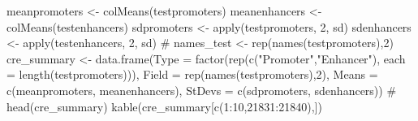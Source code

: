 \documentclass[
  letterpaper,
  DIV=11,
  numbers=noendperiod]{scrartcl}
\newenvironment{Shaded}{\begin{snugshade}}{\end{snugshade}}
\newcommand{\AttributeTok}[1]{\textcolor[rgb]{0.40,0.45,0.13}{#1}}
\newcommand{\CommentTok}[1]{\textcolor[rgb]{0.37,0.37,0.37}{#1}}
\newcommand{\DecValTok}[1]{\textcolor[rgb]{0.68,0.00,0.00}{#1}}
\newcommand{\FunctionTok}[1]{\textcolor[rgb]{0.28,0.35,0.67}{#1}}
\newcommand{\NormalTok}[1]{\textcolor[rgb]{0.00,0.23,0.31}{#1}}
\newcommand{\OtherTok}[1]{\textcolor[rgb]{0.00,0.23,0.31}{#1}}
\newcommand{\SpecialCharTok}[1]{\textcolor[rgb]{0.37,0.37,0.37}{#1}}
\newcommand{\StringTok}[1]{\textcolor[rgb]{0.13,0.47,0.30}{#1}}
\begin{document}
\begin{Shaded}
\begin{Highlighting}[]
\NormalTok{meanpromoters }\OtherTok{\textless{}{-}} \FunctionTok{colMeans}\NormalTok{(testpromoters)}
\NormalTok{meanenhancers }\OtherTok{\textless{}{-}} \FunctionTok{colMeans}\NormalTok{(testenhancers)}
\NormalTok{sdpromoters }\OtherTok{\textless{}{-}} \FunctionTok{apply}\NormalTok{(testpromoters, }\DecValTok{2}\NormalTok{, sd)}
\NormalTok{sdenhancers }\OtherTok{\textless{}{-}} \FunctionTok{apply}\NormalTok{(testenhancers, }\DecValTok{2}\NormalTok{, sd)}
\CommentTok{\# names\_test \textless{}{-} rep(names(testpromoters),2)}
\NormalTok{cre\_summary }\OtherTok{\textless{}{-}} \FunctionTok{data.frame}\NormalTok{(}\AttributeTok{Type =} \FunctionTok{factor}\NormalTok{(}\FunctionTok{rep}\NormalTok{(}\FunctionTok{c}\NormalTok{(}\StringTok{"Promoter"}\NormalTok{,}\StringTok{"Enhancer"}\NormalTok{), }
                                        \AttributeTok{each =} \FunctionTok{length}\NormalTok{(testpromoters))),}
                          \AttributeTok{Field =} \FunctionTok{rep}\NormalTok{(}\FunctionTok{names}\NormalTok{(testpromoters),}\DecValTok{2}\NormalTok{),}
                          \AttributeTok{Means =} \FunctionTok{c}\NormalTok{(meanpromoters, meanenhancers),}
                          \AttributeTok{StDevs =} \FunctionTok{c}\NormalTok{(sdpromoters, sdenhancers))}
\CommentTok{\# head(cre\_summary)}
\FunctionTok{kable}\NormalTok{(cre\_summary[}\FunctionTok{c}\NormalTok{(}\DecValTok{1}\SpecialCharTok{:}\DecValTok{10}\NormalTok{,}\DecValTok{21831}\SpecialCharTok{:}\DecValTok{21840}\NormalTok{),])}
\end{Highlighting}
\end{Shaded}
\end{document}
